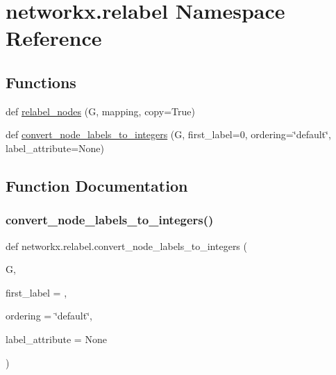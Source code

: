 \hypertarget{namespacenetworkx_1_1relabel}{}\section{networkx.\+relabel Namespace Reference}
\label{namespacenetworkx_1_1relabel}
\subsection*{Functions}
\begin{DoxyCompactItemize}
\item 
def \hyperlink{namespacenetworkx_1_1relabel_acb2e932876a58ed2a6eea531eb4f64f7}{relabel\+\_\+nodes} (G, mapping, copy=True)
\item 
def \hyperlink{namespacenetworkx_1_1relabel_a5bef030d4c309b275324f4578af84f76}{convert\+\_\+node\+\_\+labels\+\_\+to\+\_\+integers} (G, first\+\_\+label=0, ordering=\char`\"{}default\char`\"{}, label\+\_\+attribute=None)
\end{DoxyCompactItemize}


\subsection{Function Documentation}
\mbox{\label{namespacenetworkx_1_1relabel_a5bef030d4c309b275324f4578af84f76}} 
\subsubsection{\texorpdfstring{convert\+\_\+node\+\_\+labels\+\_\+to\+\_\+integers()}{convert\_node\_labels\_to\_integers()}}
{\footnotesize\ttfamily def networkx.\+relabel.\+convert\+\_\+node\+\_\+labels\+\_\+to\+\_\+integers (\begin{DoxyParamCaption}\item[{}]{G,  }\item[{}]{first\+\_\+label = {},  }\item[{}]{ordering = {\ttfamily \char`\"{}default\char`\"{}},  }\item[{}]{label\+\_\+attribute = {\ttfamily None} }\end{DoxyParamCaption})}

